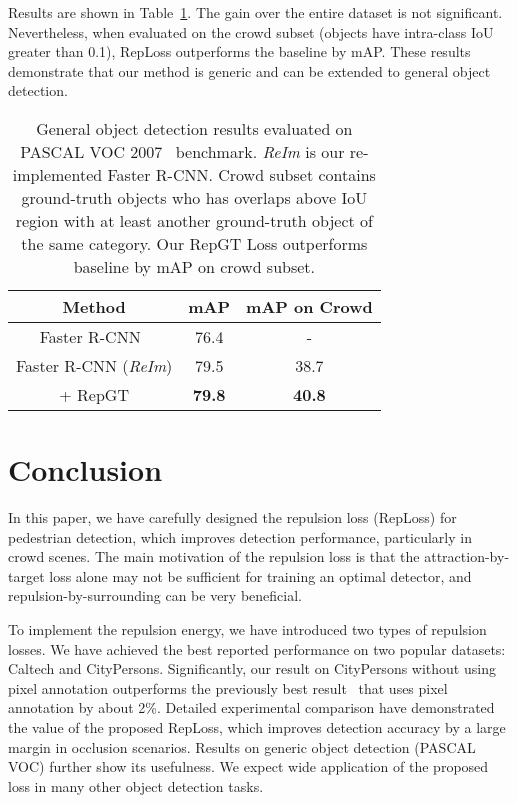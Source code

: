 \documentclass[10pt,twocolumn,letterpaper]{article}
\begin{document}
Results are shown in Table~\ref{tab:voc}. The gain over the entire dataset is not significant. Nevertheless, when evaluated on the crowd subset (objects have intra-class IoU greater than 0.1), RepLoss outperforms the baseline by  mAP. These results demonstrate that our method is generic and can be extended to general object detection.

\begin{table}[!tbp]
\begin{center}
\setlength{\tabcolsep}{5pt}
\begin{tabular}{c|c|c}
\toprule[1pt]
Method & mAP & mAP on Crowd \\
\hline
Faster R-CNN~\cite{he2016deep} & 76.4 & - \\
\hline 
Faster R-CNN (\textit{ReIm}) & 79.5 & 38.7 \\
+ RepGT & {\bf 79.8} & {\bf 40.8} \\
\bottomrule[1pt]
\end{tabular}
\end{center}
\caption{General object detection results evaluated on PASCAL VOC 2007~\cite{everingham2010pascal} benchmark. {\it ReIm} is our re-implemented Faster R-CNN. Crowd subset contains ground-truth objects who has overlaps above  IoU region with at least another ground-truth object of the same category. Our RepGT Loss outperforms baseline by  mAP on crowd subset.}
\vspace{-0.3cm}
\label{tab:voc}
\end{table}

\section{Conclusion}
In this paper, we have carefully designed the repulsion loss (RepLoss) for pedestrian detection, which improves detection performance, particularly in crowd scenes. The main motivation of the repulsion loss is that the attraction-by-target loss alone may not be sufficient for training an optimal detector, and repulsion-by-surrounding can be very beneficial. 

To implement the repulsion energy, we have introduced two types of repulsion losses. We have achieved the best reported performance on two popular datasets: Caltech and CityPersons. Significantly, our result on CityPersons without using pixel annotation outperforms the previously best result~\cite{zhang2017citypersons} that uses pixel annotation by about 2\%. Detailed experimental comparison have demonstrated the value of the proposed RepLoss, which improves detection accuracy by a large margin in occlusion scenarios. Results on generic object detection (PASCAL VOC) further show its usefulness. We expect wide application of the proposed loss in many other object detection tasks.
\end{document}

